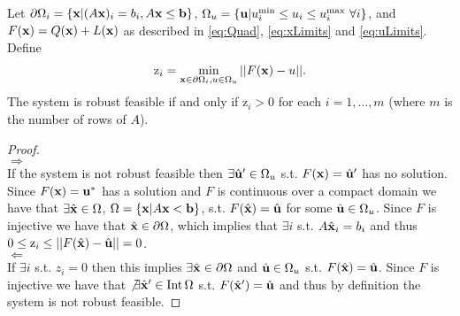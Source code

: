 \begin{thm} \label{thm:RobFeas}
Let $\partial\Omega_i=\{\mathbf{x}| (A\mathbf{x})_i = b_i, A\mathbf{x}\leq \mathbf{b}\}$, $\Omega_{u}=\{\mathbf{u}| u^{\min}_i\leq u_i \leq u^{\max}_i \ \forall i \}$, and $F(\mathbf{x})=Q(\mathbf{x})+L(\mathbf{x})$ as described in \cref{eq:Quad}, \cref{eq:xLimits} and \cref{eq:uLimits}. Define
\begin{align}
\mathrm{z}_i =  \min_{\mathbf{x}\in\partial\Omega_i, u\in \Omega_u} ||F(\mathbf{x})-u||. \label{eq:OPTfeas}
\end{align}
The system is robust feasible if and only if $\mathrm{z}_i>0$ for each $i = 1, \ldots, m$ (where $m$ is the number of rows of $A$).

\begin{proof} \ \\
$\boxed{\Rightarrow}$ \\ 
If the system is not robust feasible then $\exists\hat{\mathbf{u}}'\in \Omega_u$ s.t. $F(\mathbf{x})=\hat{\mathbf{u}}'$ has no solution. 
Since $F(\mathbf{x})=\mathbf{u}^*$ has a solution and $F$ is continuous over a compact domain we have that $\exists \hat{\mathbf{x}}\in\Omega$, $\Omega=\{\mathbf{x}| A\mathbf{x}< \mathbf{b}\}$, s.t. $F(\hat{\mathbf{x}})=\hat{\mathbf{u}}$ for some $\hat{\mathbf{u}}\in \Omega_u$. 
Since $F$ is injective we have that $\hat{\mathbf{x}}\in\partial\Omega$, which implies that $\exists i$ s.t. $A\hat{\mathbf{x}}_i=b_i$ and thus $0\leq \mathrm{z}_i \leq ||F(\hat{\mathbf{x}})-\hat{\mathbf{u}}||=0$.\\
$\boxed{\Leftarrow}$ \\ 
If $\exists i$ s.t. $z_i = 0$ then this implies $\exists\hat{\mathbf{x}}\in\partial\Omega $ and $\hat{\mathbf{u}}\in \Omega_u$ s.t. $F(\hat{\mathbf{x}})=\hat{\mathbf{u}}$. 
Since $F$ is injective we have that $\not\exists\hat{\mathbf{x}}'\in\operatorname{Int}\Omega $ s.t. $F(\hat{\mathbf{x}}')=\hat{\mathbf{u}}$ and thus by definition the system is not robust feasible.


\end{proof}
\end{thm}



